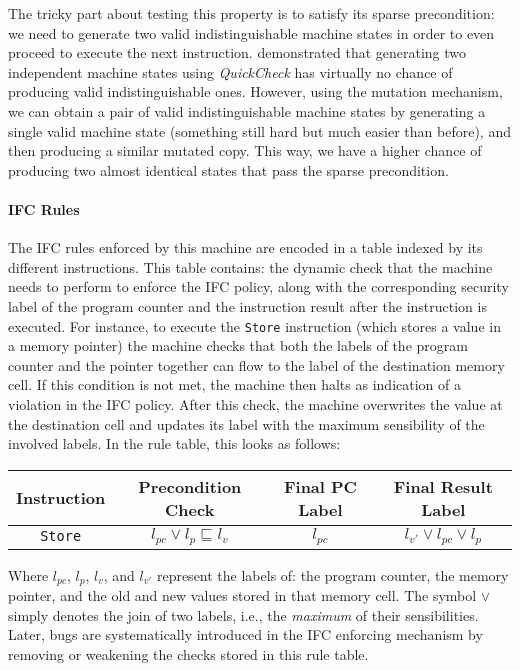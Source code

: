 \documentclass[sigconf,review,anonymous]{acmart}
\newcommand{\quickcheck}{\textit{QuickCheck}\xspace}
\begin{document}
The tricky part about testing this property is to satisfy its sparse
precondition: we need to generate two valid indistinguishable machine states in
order to even proceed to execute the next instruction.
%
\citeauthor{lampropoulos2019coverage} demonstrated that generating two
independent machine states using \quickcheck has virtually no chance of
producing valid indistinguishable ones.
%
However, using the mutation mechanism, we can obtain a pair of valid
indistinguishable machine states by generating a single valid machine state
(something still hard but much easier than before), and then producing a similar
mutated copy.
%
This way, we have a higher chance of producing two almost identical states that
pass the sparse precondition.

\paragraph{IFC Rules}

The IFC rules enforced by this machine are encoded in a table indexed by its
different instructions.
%
This table contains: the dynamic check that the machine needs to perform to
enforce the IFC policy, along with the corresponding security label of the
program counter and the instruction result after the instruction is executed.
%
For instance, to execute the \texttt{Store} instruction (which stores a value in
a memory pointer) the machine checks that both the labels of the program counter
and the pointer together can flow to the label of the destination memory cell.
%
If this condition is not met, the machine then halts as indication of a
violation in the IFC policy.
%
After this check, the machine overwrites the value at the destination cell and
updates its label with the maximum sensibility of the involved labels.
%
In the rule table, this looks as follows:

\begin{center}
\scriptsize
\begin{tabular}{|c|c|c|c|}
\hline
\textbf{Instruction}
& \textbf{Precondition Check}
& \textbf{Final PC Label}
& \textbf{Final Result Label} \\
\hline
\texttt{Store}
& $l_{pc} \vee l_{p} \sqsubseteq l_{v}$
& $l_{pc}$
& $l_{v'} \vee l_{pc} \vee l_{p}$ \\
\hline
\end{tabular}
\end{center}

\noindent Where $l_{pc}$, $l_{p}$, $l_{v}$, and $l_{v'}$ represent the labels
of: the program counter, the memory pointer, and the old and new values stored in
that memory cell.
%
The symbol $\vee$ simply denotes the join of two labels, i.e., the
\emph{maximum} of their sensibilities.
%
Later, bugs are systematically introduced in the IFC enforcing mechanism by
removing or weakening the checks stored in this rule table.
\end{document}
